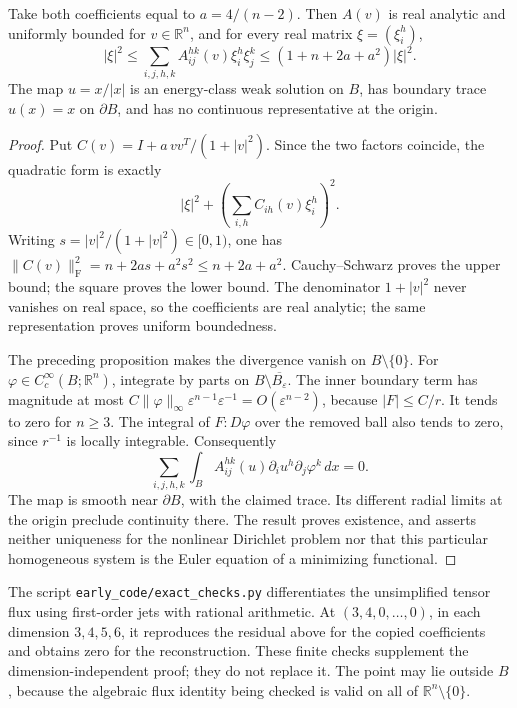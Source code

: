 \begin{proposition}\ours
Take both coefficients equal to \(a=4/(n-2)\). Then \(A(v)\) is real analytic and uniformly bounded for \(v\in\mathbb R^n\), and for every real matrix \(\xi=(\xi_i^h)\),
\[
 |\xi|^2\le
 \sum_{i,j,h,k}A_{ij}^{hk}(v)\xi_i^h\xi_j^k
 \le (1+n+2a+a^2)|\xi|^2.
\]
The map \(u=x/|x|\) is an energy-class weak solution on \(B\), has boundary trace \(u(x)=x\) on \(\partial B\), and has no continuous representative at the origin.
\end{proposition}
\begin{proof}
Put \(C(v)=I+a\,vv^T/(1+|v|^2)\). Since the two factors coincide, the quadratic form is exactly
\[
 |\xi|^2+\left(\sum_{i,h}C_{ih}(v)\xi_i^h\right)^2.
\]
Writing \(s=|v|^2/(1+|v|^2)\in[0,1)\), one has
\(\|C(v)\|_{\mathrm F}^2=n+2as+a^2s^2\le n+2a+a^2\).
Cauchy--Schwarz proves the upper bound; the square proves the lower bound. The denominator \(1+|v|^2\) never vanishes on real space, so the coefficients are real analytic; the same representation proves uniform boundedness.

The preceding proposition makes the divergence vanish on \(B\setminus\{0\}\). For \(\varphi\in C_c^\infty(B;\mathbb R^n)\), integrate by parts on \(B\setminus\overline{B_\varepsilon}\). The inner boundary term has magnitude at most \(C\|\varphi\|_\infty\varepsilon^{n-1}\varepsilon^{-1}=O(\varepsilon^{n-2})\), because \(|F|\le C/r\). It tends to zero for \(n\ge3\). The integral of \(F:D\varphi\) over the removed ball also tends to zero, since \(r^{-1}\) is locally integrable. Consequently
\[
 \sum_{i,j,h,k}\int_B A_{ij}^{hk}(u)\partial_i u^h\partial_j\varphi^k\,dx=0.
\]
The map is smooth near \(\partial B\), with the claimed trace. Its different radial limits at the origin preclude continuity there. The result proves existence, and asserts neither uniqueness for the nonlinear Dirichlet problem nor that this particular homogeneous system is the Euler equation of a minimizing functional.
\end{proof}

\begin{remark}\oursComputed
The script \texttt{early\_code/exact\_checks.py} differentiates the unsimplified tensor flux using first-order jets with rational arithmetic. At \((3,4,0,\ldots,0)\), in each dimension \(3,4,5,6\), it reproduces the residual above for the copied coefficients and obtains zero for the reconstruction. These finite checks supplement the dimension-independent proof; they do not replace it. The point may lie outside \(B\), because the algebraic flux identity being checked is valid on all of \(\mathbb R^n\setminus\{0\}\).
\end{remark}

